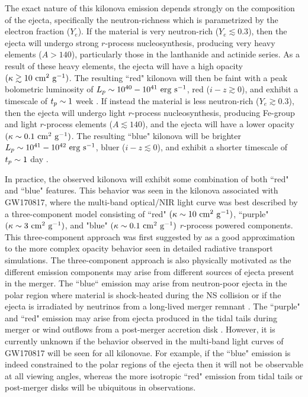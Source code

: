 The exact nature of this kilonova emission depends strongly on the composition of the ejecta, specifically the neutron-richness which is parametrized by the electron fraction ($Y_e$). If the material is very neutron-rich ($Y_e \lesssim 0.3$), then the ejecta will undergo strong $r$-process nucleosynthesis, producing very heavy elements ($A > 140$), particularly those in the lanthanide and actinide series. As a result of these heavy elements, the ejecta will have a high opacity $(\kappa \gtrsim 10 \rm\ cm^2\ g^{-1})$. The resulting ``red" kilonova will then be faint with a peak bolometric luminosity of $L_p \sim10^{40}-10^{41} \rm\ erg\ s^{-1}$, red ($i-z \gtrsim 0$), and exhibit a timescale of $t_p \sim1$ week \citep{BarnesKasen13,TanakaHotokezaka13}. If instead the material is less neutron-rich ($Y_e \gtrsim 0.3$), then the ejecta will undergo light $r$-process nucleosynthesis, producing Fe-group and light $r$-process elements ($A \lesssim 140$), and the ejecta will have a lower opacity $(\kappa \sim0.1 \rm\ cm^2\ g^{-1})$. The resulting ``blue" kilonova will be brighter $L_p \sim10^{41}-10^{42} \rm\ erg\ s^{-1}$, bluer ($i-z \lesssim 0$), and exhibit a shorter timescale of $t_p \sim1$ day \citep{Metzger+10,MetzgerFernandez14}.

In practice, the observed kilonova will exhibit some combination of both ``red" and ``blue" features. This behavior was seen in the kilonova associated with GW170817, where the multi-band optical/NIR light curve was best described by a three-component model consisting of ``red"  $(\kappa \sim10 \rm\ cm^2\ g^{-1})$, ``purple"  $(\kappa \sim3 \rm\ cm^2\ g^{-1})$, and "blue"  $(\kappa \sim0.1 \rm\ cm^2\ g^{-1})$ $r$-process powered components. This three-component approach was first suggested by \citet{Tanaka+17} as a good approximation to the more complex opacity behavior seen in detailed radiative transport simulations. The three-component approach is also physically motivated as the different emission components may arise from different sources of ejecta present in the merger. The ``blue`` emission may arise from neutron-poor ejecta in the polar region where material is shock-heated during the NS collision \citep{Oechslin+07,Bauswein+13a,Sekiguchi+16} or if the ejecta is irradiated by neutrinos from a long-lived merger remnant \citep{FernandezMetzger13,Just+15,Kasen+15}. The ``purple" and ``red" emission may arise from ejecta produced in the tidal tails during merger \cite{Rosswog+99,Hotokezaka+13} or wind outflows from a post-merger accretion disk \citep{Just+15,SiegelMetzger17}. However, it is currently unknown if the behavior observed in the multi-band light curves of GW170817 will be seen for all kilonovae. For example, if the ``blue" emission is indeed constrained to the polar regions of the ejecta then it will not be observable at all viewing angles, whereas the more isotropic ``red" emission from tidal tails or post-merger disks will be ubiquitous in observations.

